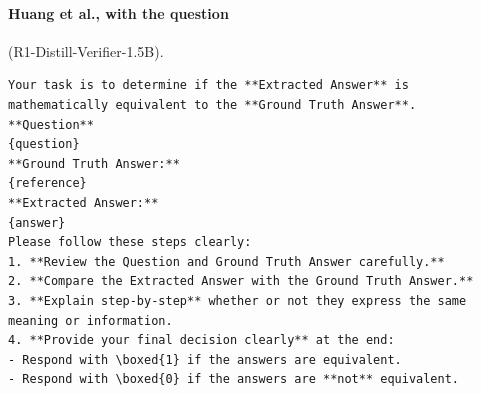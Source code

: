 \documentclass[11pt]{article}
\begin{document}
\par\addvspace{1ex}\noindent\begin{minipage}{\columnwidth}
\paragraph{Huang et al., with the question} (R1-Distill-Verifier-1.5B).
\begin{Verbatim}[breaklines, breakanywhere, fontsize=\scriptsize, frame=single]
Your task is to determine if the **Extracted Answer** is mathematically equivalent to the **Ground Truth Answer**.
**Question**
{question}
**Ground Truth Answer:**
{reference}
**Extracted Answer:**
{answer}
Please follow these steps clearly:
1. **Review the Question and Ground Truth Answer carefully.**
2. **Compare the Extracted Answer with the Ground Truth Answer.**
3. **Explain step-by-step** whether or not they express the same meaning or information.
4. **Provide your final decision clearly** at the end:
- Respond with \boxed{1} if the answers are equivalent.
- Respond with \boxed{0} if the answers are **not** equivalent.
\end{Verbatim}
\end{minipage}
\end{document}
